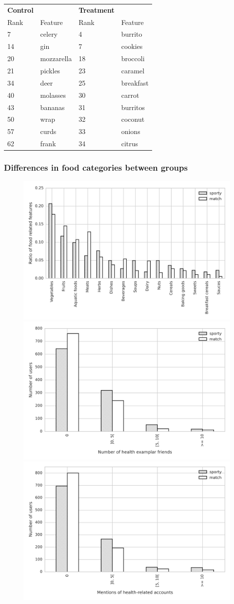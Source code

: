 \documentclass[letterpaper]{article}
\begin{document}
\begin{table}
\center
\begin{tabular}{llll}
\toprule
\textbf{Control} & & \textbf{Treatment} & \\
Rank & Feature & Rank & Feature \\
\cmidrule(lr){1-2} \cmidrule(lr){3-4}
7  &      celery & 4  &    burrito \\
14 &         gin & 7  &    cookies \\
20 &  mozzarella & 18 &   broccoli \\
21 &     pickles & 23 &    caramel \\
34 &        deer & 25 &  breakfast \\
40 &    molasses & 30 &     carrot \\
43 &     bananas & 31 &   burritos \\
50 &        wrap & 32 &    coconut \\
57 &       curds & 33 &     onions \\
62 &       frank & 34 &     citrus \\
\bottomrule
\end{tabular}
\end{table}

\subsubsection{Differences in food categories between groups}

\begin{figure}
  \includegraphics[width=.45\textwidth]{figs/top_food_cats.png}\\
  \includegraphics[width=.45\textwidth]{figs/exemplar_friends.png}\\
  \includegraphics[width=.45\textwidth]{figs/exemplar_mentions.png}\\
\end{figure}
\end{document}

